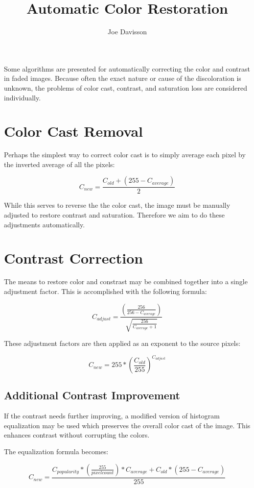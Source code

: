 \documentclass{article}
\title{Automatic Color Restoration}
\author{Joe Davisson} %
\begin{document}
\maketitle

Some algorithms are presented for automatically correcting the
color and contrast in faded images. Because often the exact nature or cause
of the discoloration is unknown, the problems of color cast, contrast, and
saturation loss are considered individually.

\section{Color Cast Removal}
Perhaps the simplest way to correct color cast is to simply average each
pixel by the inverted average of all the pixels:

\[ C_{new} = \frac{C_{old} + \left(255 - C_{average}\right) }{2} \]

While this serves to reverse the the color cast, the image must be manually
adjusted to restore contrast and saturation. Therefore we aim to do these
adjustments automatically.

\section{Contrast Correction}
The means to restore color and constrast may be combined together into a single
adjustment factor. This is accomplished with the following formula:

\[ C_{adjust} = \frac{\left(\frac{256} {256 - C_{average}}\right)}
                     {\sqrt{\frac{256} { C_{average} + 1}}} \]

These adjustment factors are then applied as an exponent to the source pixels:

\[ C_{new} = 255 * \left(\frac{C_{old}}{255}\right) ^ {C_{adjust}} \]

\subsection{Additional Contrast Improvement}
If the contrast needs further improving, a modified version of histogram
equalization may be used which preserves the overall color cast of the image.
This enhances contrast without corrupting the colors.

The equalization formula becomes:

\[ C_{new} = \frac{C_{popularity} * \left(\frac{255}{pixel count}\right) * C_{average}
                   + C_{old} * \left(255 - C_{average}\right)}{255} \]
\end{document}

